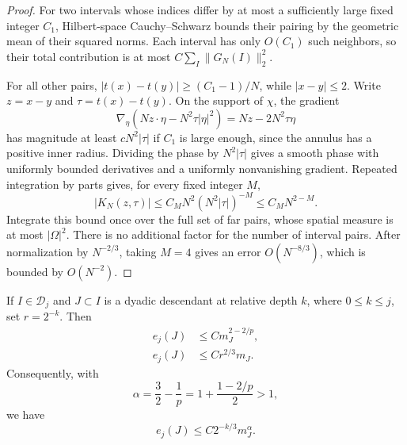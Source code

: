 \begin{proof}
For two intervals whose indices differ by at most a sufficiently large
fixed integer $C_1$, Hilbert-space Cauchy--Schwarz bounds their pairing by
the geometric mean of their squared norms.  Each interval has only
$O(C_1)$ such neighbors, so their total contribution is at most
$C\sum_I\|G_N(I)\|_2^2$.

For all other pairs, $|t(x)-t(y)|\ge(C_1-1)/N$, while
$|x-y|\le2$.  Write $z=x-y$ and $\tau=t(x)-t(y)$.  On the support of
$\chi$, the gradient
\[
 \nabla_\eta(Nz\cdot\eta-N^2\tau|\eta|^2)
      =Nz-2N^2\tau\eta
\]
has magnitude at least $cN^2|\tau|$ if $C_1$ is large enough, since the
annulus has a positive inner radius.  Dividing the phase by
$N^2|\tau|$ gives a smooth phase with uniformly bounded derivatives and
a uniformly nonvanishing gradient.  Repeated integration by parts gives,
for every fixed integer $M$,
\[
 |K_N(z,\tau)|\le C_M N^2(N^2|\tau|)^{-M}
                 \le C_M N^{2-M}.
\]
Integrate this bound once over the full set of far pairs, whose spatial
measure is at most $|\Omega|^2$.  There is no additional factor for the
number of interval pairs.  After normalization by $N^{-2/3}$, taking
$M=4$ gives an error $O(N^{-8/3})$, which is bounded by $O(N^{-2})$.
\end{proof}

\begin{lemma}
\label{lem:endpoint-localized-dual}
If $I\in\mathcal D_j$ and $J\subset I$ is a dyadic descendant at relative
depth $k$, where $0\le k\le j$, set $r=2^{-k}$.  Then
\begin{align}
 e_j(J)&\le C m_J^{2-2/p},
 \label{eq:endpoint-mass-bound}\\
 e_j(J)&\le C r^{2/3}m_J.
 \label{eq:endpoint-spatial-bound}
\end{align}
Consequently, with
\[
 \alpha=\frac32-\frac1p=1+\frac{1-2/p}{2}>1,
\]
we have
\begin{equation}
 e_j(J)\le C2^{-k/3}m_J^\alpha.
 \label{eq:endpoint-interpolated-dual}
\end{equation}
\end{lemma}

